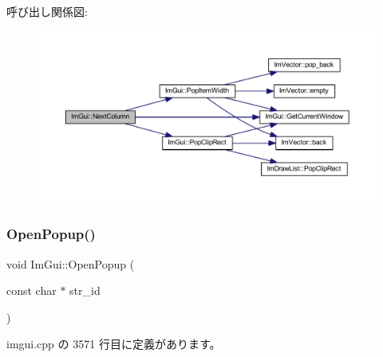 呼び出し関係図\+:\nopagebreak
\begin{figure}[H]
\begin{center}
\leavevmode
\includegraphics[width=350pt]{namespace_im_gui_a8f97746d6a9d59c8400c26fb7613a2ff_cgraph}
\end{center}
\end{figure}
\mbox{\label{namespace_im_gui_a9576648c40b92f54b671e2e51654dd2c}} 
\subsubsection{\texorpdfstring{Open\+Popup()}{OpenPopup()}}
{\footnotesize\ttfamily void Im\+Gui\+::\+Open\+Popup (\begin{DoxyParamCaption}\item[{const char $\ast$}]{str\+\_\+id }\end{DoxyParamCaption})}



 imgui.\+cpp の 3571 行目に定義があります。

